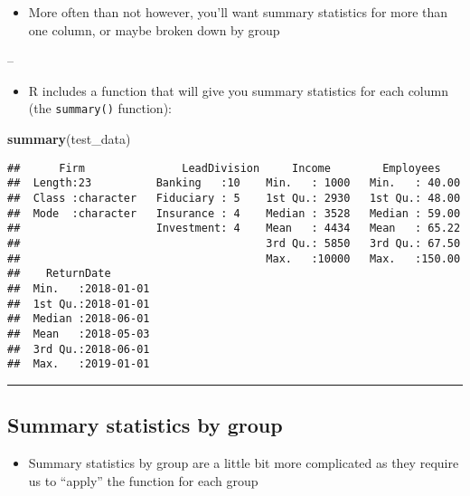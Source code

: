 \documentclass[]{article}
\newenvironment{Shaded}{\begin{snugshade}}{\end{snugshade}}
\newcommand{\KeywordTok}[1]{\textcolor[rgb]{0.13,0.29,0.53}{\textbf{#1}}}
\newcommand{\NormalTok}[1]{#1}
\providecommand{\tightlist}{%
  \setlength{\itemsep}{0pt}\setlength{\parskip}{0pt}}
\begin{document}
\begin{itemize}
\tightlist
\item
  More often than not however, you'll want summary statistics for more
  than one column, or maybe broken down by group
\end{itemize}

--

\begin{itemize}
\tightlist
\item
  R includes a function that will give you summary statistics for each
  column (the \texttt{summary()} function):
\end{itemize}

\begin{Shaded}
\begin{Highlighting}[]
\KeywordTok{summary}\NormalTok{(test_data)}
\end{Highlighting}
\end{Shaded}

\begin{verbatim}
##      Firm               LeadDivision     Income        Employees     
##  Length:23          Banking   :10    Min.   : 1000   Min.   : 40.00  
##  Class :character   Fiduciary : 5    1st Qu.: 2930   1st Qu.: 48.00  
##  Mode  :character   Insurance : 4    Median : 3528   Median : 59.00  
##                     Investment: 4    Mean   : 4434   Mean   : 65.22  
##                                      3rd Qu.: 5850   3rd Qu.: 67.50  
##                                      Max.   :10000   Max.   :150.00  
##    ReturnDate        
##  Min.   :2018-01-01  
##  1st Qu.:2018-01-01  
##  Median :2018-06-01  
##  Mean   :2018-05-03  
##  3rd Qu.:2018-06-01  
##  Max.   :2019-01-01
\end{verbatim}

\begin{center}\rule{0.5\linewidth}{\linethickness}\end{center}

\hypertarget{summary-statistics-by-group}{%
\subsection{Summary statistics by
group}\label{summary-statistics-by-group}}

\begin{itemize}
\tightlist
\item
  Summary statistics by group are a little bit more complicated as they
  require us to ``apply'' the function for each group
\end{itemize}
\end{document}
